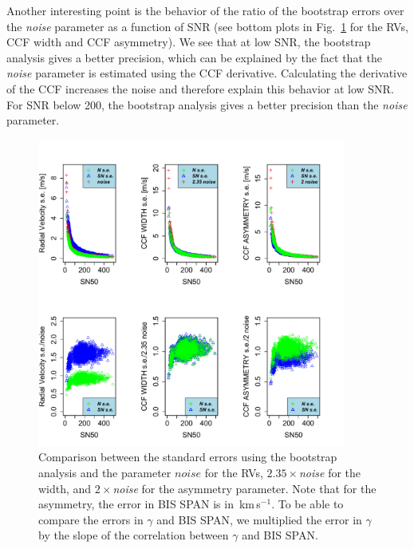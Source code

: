 \documentclass[11pt, oneside]{article}
\def\kms{\hbox{\,km\,s$^{-1}$}}       %
\begin{document}
Another interesting point is the behavior of the ratio of the bootstrap errors over the \emph{noise} parameter as a function of SNR (see bottom plots in Fig.~\ref{fig:se} for the RVs, CCF width and CCF asymmetry). We see that at low SNR, the bootstrap analysis gives a better precision, which can be explained by the fact that the \emph{noise} parameter is estimated using the CCF derivative. Calculating the derivative of the CCF increases the noise and therefore explain this behavior at low SNR. For SNR below 200, the bootstrap analysis gives a better precision than the \emph{noise} parameter.
%
\begin{figure}[htbp]
   \centering
\includegraphics[height = 4in]{[5]Errors_vs_SNR_all_stars.pdf} 
   \caption{Comparison between the standard errors using the bootstrap analysis and the parameter $noise$ for the RVs, $2.35\times$\emph{noise} for the width, and $2\times$\emph{noise} for the asymmetry parameter. Note that for the asymmetry, the error in BIS SPAN is in \kms. To be able to compare the errors in $\gamma$ and BIS SPAN, we multiplied the error in $\gamma$ by the slope of the correlation between $\gamma$ and BIS SPAN.}
   \label{fig:se}
\end{figure}
\end{document}
